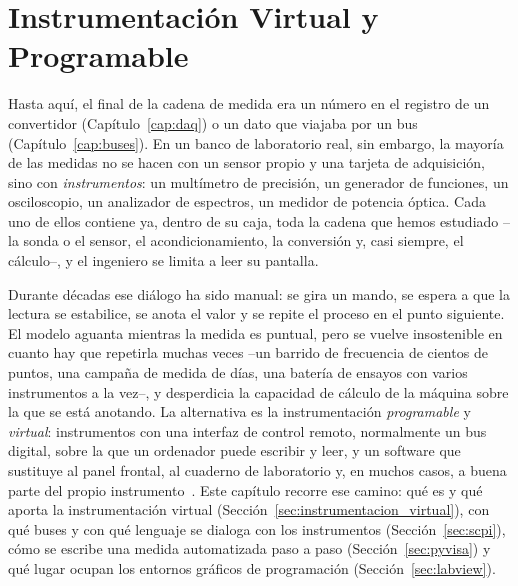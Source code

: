 

\chapter{Instrumentación Virtual y Programable}\label{cap:instrumentacion_virtual}

Hasta aquí, el final de la cadena de medida era un número en el registro de un convertidor (Capítulo~\ref{cap:daq}) o un dato que viajaba por un bus (Capítulo~\ref{cap:buses}). En un banco de laboratorio real, sin embargo, la mayoría de las medidas no se hacen con un sensor propio y una tarjeta de adquisición, sino con \emph{instrumentos}: un multímetro de precisión, un generador de funciones, un osciloscopio, un analizador de espectros, un medidor de potencia óptica. Cada uno de ellos contiene ya, dentro de su caja, toda la cadena que hemos estudiado --la sonda o el sensor, el acondicionamiento, la conversión y, casi siempre, el cálculo--, y el ingeniero se limita a leer su pantalla.

Durante décadas ese diálogo ha sido manual: se gira un mando, se espera a que la lectura se estabilice, se anota el valor y se repite el proceso en el punto siguiente. El modelo aguanta mientras la medida es puntual, pero se vuelve insostenible en cuanto hay que repetirla muchas veces --un barrido de frecuencia de cientos de puntos, una campaña de medida de días, una batería de ensayos con varios instrumentos a la vez--, y desperdicia la capacidad de cálculo de la máquina sobre la que se está anotando. La alternativa es la instrumentación \emph{programable} y \emph{virtual}: instrumentos con una interfaz de control remoto, normalmente un bus digital, sobre la que un ordenador puede escribir y leer, y un software que sustituye al panel frontal, al cuaderno de laboratorio y, en muchos casos, a buena parte del propio instrumento~\cite{johnson2006labview}. Este capítulo recorre ese camino: qué es y qué aporta la instrumentación virtual (Sección~\ref{sec:instrumentacion_virtual}), con qué buses y con qué lenguaje se dialoga con los instrumentos (Sección~\ref{sec:scpi}), cómo se escribe una medida automatizada paso a paso (Sección~\ref{sec:pyvisa}) y qué lugar ocupan los entornos gráficos de programación (Sección~\ref{sec:labview}).

